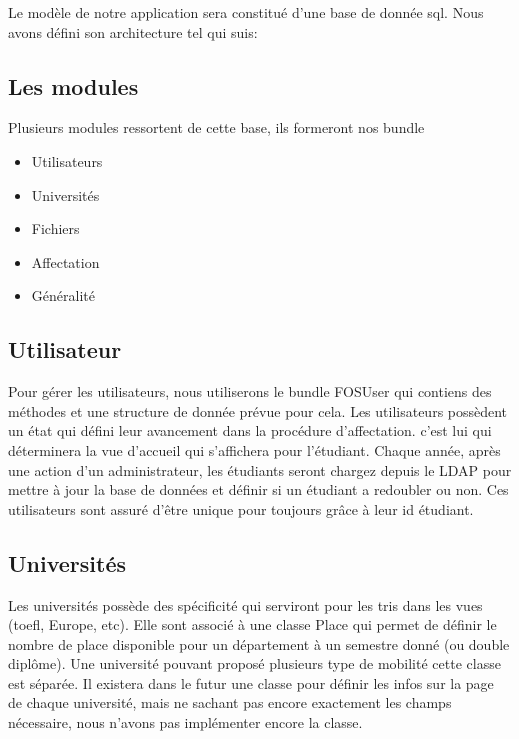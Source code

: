 Le modèle de notre application sera constitué d'une base de donnée sql. Nous avons défini son architecture tel qui suis:


\subsection{Les modules}
Plusieurs modules ressortent de cette base, ils formeront nos bundle
\begin{itemize}
\item Utilisateurs
\item Universités
\item Fichiers
\item Affectation
\item Généralité
\end{itemize}

\subsection{Utilisateur}

Pour gérer les utilisateurs, nous utiliserons le bundle FOSUser qui contiens des méthodes et une structure de donnée prévue pour cela.
Les utilisateurs possèdent un état qui défini leur avancement dans la procédure d'affectation. c'est lui qui déterminera la vue d'accueil qui s'affichera pour l'étudiant. 
Chaque année, après une action d'un administrateur, les étudiants seront chargez depuis le LDAP pour mettre à jour la base de données et définir si un étudiant a redoubler ou non.
Ces utilisateurs sont assuré d'être unique pour toujours grâce à leur id étudiant.

\subsection{Universités}

Les universités possède des spécificité qui serviront pour les tris dans les vues (toefl, Europe, etc).
Elle sont associé à une classe Place qui permet de définir le nombre de place disponible pour un département à un semestre donné (ou double diplôme). Une université pouvant proposé plusieurs type de mobilité cette classe est séparée.
Il existera dans le futur une classe pour définir les infos sur la page de chaque université, mais ne sachant pas encore exactement les champs nécessaire, nous n'avons pas implémenter encore la classe.

